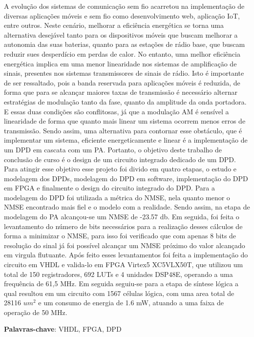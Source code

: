 A evolução dos sistemas de comunicação sem fio acarretou na implementação de diversas aplicações móveis e sem fio como desenvolvimento web, aplicação IoT, entre outros. Neste cenário, melhorar a eficiência energética se torna uma alternativa desejável tanto para os dispositivos móveis que buscam melhorar a autonomia das suas baterias, quanto para as estações de rádio base, que buscam reduzir sues desperdício em perdas de calor. No entanto, uma melhor eficiência energética implica em uma menor linearidade nos sistemas de amplificação de sinais, presentes nos sistemas transmissores de sinais de rádio. Isto é importante de ser ressaltado, pois a banda reservada para aplicações móveis é reduzida, de forma que para se alcançar maiores taxas de transmissão é necessário alternar estratégias de modulação tanto da fase, quanto da amplitude da onda portadora. E essas duas condições são conflitosas, já que a modulação AM é sensível a linearidade de forma que quanto mais linear um sistema ocorrem menos erros de transmissão. Sendo assim, uma alternativa para contornar esse obstáculo, que é implementar um sistema, eficiente energeticamente e linear é a implementação de um DPD em cascata com um PA. Portanto, o objetivo deste trabalho de conclusão de curso é o design de um circuito integrado dedicado de um DPD. Para atingir esse objetivo esse projeto foi divido em quatro etapas, o estudo e modelagem dos DPDs, modelagem do DPD em software, implementação do DPD em FPGA e finalmente o design do circuito integrado do DPD. Para a modelagem do DPD foi utilizada a métrica do NMSE, nela quanto menor o NMSE encontrado mais fiel e o modelo com a realidade. Sendo assim, na etapa de modelagem do PA alcançou-se um NMSE de -23.57 db. Em seguida, foi feita o levantamento do número de bits necessários para a realização desses cálculos de forma a minimizar o NMSE, para isso foi verificado que com apenas 8 bits de resolução do sinal já foi possível alcançar um NMSE próximo do valor alcançado em virgula flutuante. Após feito esses levantamentos foi feita a implementação do circuito em VHDL e valida-lo em FPGA Virtex5 XC5VLX50T, que utilizou um total de 150 registradores, 692 LUTs e 4 unidades DSP48E, operando a uma frequência de 61,5 MHz. Em seguida seguiu-se para a etapa de síntese lógica a qual resultou em um circuito com 1567 células lógica, com uma area total de 28116 $um^2$ e um consumo de energia de 1.6 mW, atuando a uma faixa de operação de 50 MHz.

\textbf{Palavras-chave}: VHDL, FPGA, DPD 
